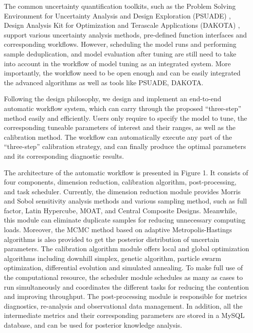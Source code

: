 \documentclass[gmd, manuscript]{copernicus}
\begin{document}
The common uncertainty quantification toolkits, such as the Problem Solving Environment for Uncertainty Analysis and Design Exploration (PSUADE) \citep{tong2005psuade}, Design Analysis Kit for Optimization and Terascale Applications (DAKOTA) \citep{eldred2007investigation}, support various uncertainty analysis methods, pre-defined function interfaces and corresponding workflows. However, scheduling the model runs and performing sample deduplication, and model evaluation after tuning are still need to take into account in the workflow of model tuning as an integrated system. More importantly, the workflow need to be open enough and can be easily integrated the advanced algorithms as well as tools like PSUADE, DAKOTA.
   
Following the design philosophy, we design and implement an end-to-end automatic workflow system, which can carry through the proposed “three-step” method easily and efficiently. Users only require to specify the model to tune, the corresponding tuneable parameters of interest and their ranges, as well as the calibration method. The workflow can automatically execute any part of the ``three-step'' calibration strategy, and can finally produce the optimal parameters and its corresponding diagnostic results.

The architecture of the automatic workflow is presented in Figure 1. It consists of four components, dimension reduction, calibration algorithm, post-processing, and task scheduler. Currently, the dimension reduction module provides Morris and Sobol sensitivity analysis methods and various sampling method, such as full factor, Latin Hypercube, MOAT, and Central Composite Designs. Meanwhile, this module can eliminate duplicate samples for reducing unnecessary computing loads. Moreover, the MCMC method based on adaptive Metropolis-Hastings algorithms is also provided to get the posterior distribution of uncertain parameters. The calibration algorithm module offers local and global optimization algorithms including downhill simplex, genetic algorithm, particle swarm optimization, differential evolution and simulated annealing. To make full use of the computational resource, the scheduler module schedules as many as cases to run simultaneously and coordinates the different tasks for reducing the contention and improving throughput. The post-processing module is responsible for metrics diagnostics, re-analysis and observational data management. In addition, all the intermediate metrics and their corresponding parameters are stored in a MySQL database, and can be used for posterior knowledge analysis.
\end{document}
